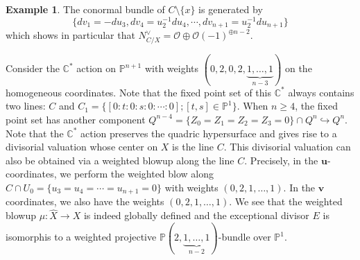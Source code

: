 \documentclass[12pt]{amsart}
\theoremstyle{definition}
\newtheorem{ex}[thm]{Example}
\newcommand{\IC}{{\mathbb C}}
\newcommand{\IP}{{\mathbb P}}
\newcommand{\CO}{{\mathcal O}}
\begin{document}
\begin{ex}
    
    The conormal bundle of $C\setminus \{x\}$ is generated by $$\{d v_1=-du_3, d v_4=u_2^{-1} du_4, \cdots, d v_{n+1}=u_2^{-1} du_{n+1}\}$$
    which shows in particular that $N^{\vee}_{C/X}=\CO\oplus\CO(-1)^{\oplus n-2}$. 
   
    Consider the $\IC^*$ action on $\IP^{n+1}$ with weights $(0, 2, 0, 2, \underbrace{1,\dots, 1}_{n-3})$ on the homogeneous coordinates. 
   Note that the fixed point set of this $\IC^*$ always contains two lines: $C$ and $C_1=\{[0:t:0:s:0:\cdots: 0]; [t,s]\in \IP^1\}$. When $n\ge 4$, the fixed point set has another component $Q^{n-4}=\{Z_0=Z_1=Z_2=Z_3=0\}\cap Q^n\hookrightarrow Q^n$. Note that the $\IC^*$ action preserves the quadric hypersurface and gives rise to a divisorial valuation whose center on $X$ is the line $C$. This divisorial valuation can also be obtained via a weighted blowup along the line $C$. Precisely, in the 
    $\mathbf{u}$-coordinates, we perform the weighted blow along $C\cap U_0=\{u_3=u_4=\cdots=u_{n+1}=0\}$
    with weights $(0, 2, 1, \dots, 1)$. In the $\mathbf{v}$ coordinates, we also have the weights $(0, 2, 1,\dots, 1)$. We see that the weighted blowup $\mu: \hat{X}\rightarrow X$ is indeed globally defined and the exceptional divisor $E$ is isomorphis to a weighted projective $\IP(2, \underbrace{1, \dots, 1}_{n-2})$-bundle over $\IP^1$.
    

\end{ex}
\end{document}
